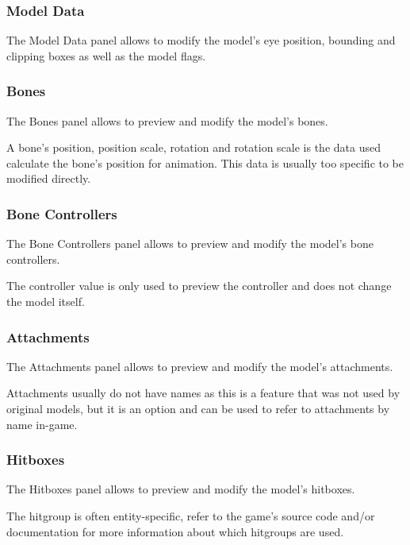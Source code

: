 \documentclass[10pt, a4paper, titlepage, oneside]{article}
\begin{document}
\subsubsection{Model Data}

The Model Data panel allows to modify the model's eye position, bounding and clipping boxes as well as the model flags.

\subsubsection{Bones}

The Bones panel allows to preview and modify the model's bones.

\vspace{\baselineskip}
A bone's position, position scale, rotation and rotation scale is the data used calculate the bone's position for animation. This data is usually too specific to be modified directly.

\subsubsection{Bone Controllers}

The Bone Controllers panel allows to preview and modify the model's bone controllers.

\vspace{\baselineskip}
The controller value is only used to preview the controller and does not change the model itself.

\subsubsection{Attachments}

The Attachments panel allows to preview and modify the model's attachments.

\vspace{\baselineskip}
Attachments usually do not have names as this is a feature that was not used by original models, but it is an option and can be used to refer to attachments by name in-game.

\subsubsection{Hitboxes}

The Hitboxes panel allows to preview and modify the model's hitboxes.

\vspace{\baselineskip}
The hitgroup is often entity-specific, refer to the game's source code and/or documentation for more information about which hitgroups are used.
\end{document}
